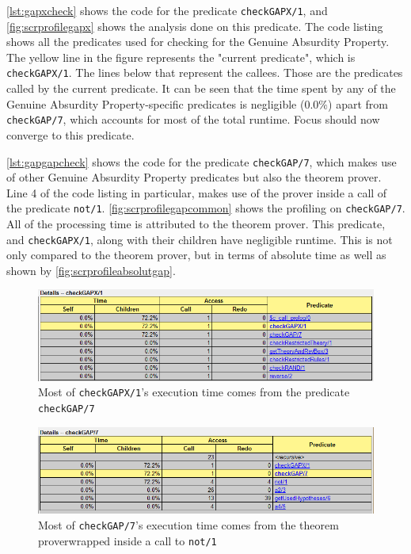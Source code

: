 \documentclass[11pt,twoside,a4paper]{report}
\begin{document}
\autoref{lst:gapxcheck} shows the code for the predicate \lstinline$checkGAPX/1$, and \autoref{fig:scrprofilegapx} shows the analysis done on this predicate. The code listing shows all the predicates used for checking for the Genuine Absurdity Property. The yellow line in the figure represents the "current predicate", which is \lstinline$checkGAPX/1$. The lines below that represent the callees. Those are the predicates called by the current predicate. It can be seen that the time spent by any of the Genuine Absurdity Property-specific predicates is negligible ($0.0\%$) apart from \lstinline$checkGAP/7$, which accounts for most of the total runtime. Focus should now converge to this predicate.

\autoref{lst:gapgapcheck} shows the code for the predicate \lstinline$checkGAP/7$, which makes use of other Genuine Absurdity Property predicates but also the theorem prover. Line 4 of the code listing in particular, makes use of the prover inside a call of the predicate \lstinline$not/1$. \autoref{fig:scrprofilegapcommon} shows the profiling on \lstinline$checkGAP/7$. All of the processing time is attributed to the theorem prover. This predicate, and \lstinline$checkGAPX/1$, along with their children have negligible runtime. This is not only compared to the theorem prover, but in terms of absolute time as well as shown by \autoref{fig:scrprofileabsolutgap}.

\begin{figure}[htp]
\centerline{\includegraphics[scale=0.6]{img/scr-profile-gapx.png}}
\caption{Most of \lstinline$checkGAPX/1$'s execution time comes from the predicate \lstinline$checkGAP/7$\label{fig:scrprofilegapx}}
\end{figure}

\begin{figure}[htp]
\centerline{\includegraphics[scale=0.6]{img/scr-profile-gapcommon.png}}
\caption{Most of \lstinline$checkGAP/7$'s execution time comes from the theorem proverwrapped inside a call to \lstinline$not/1$\label{fig:scrprofilegapcommon}}
\end{figure}
\end{document}
